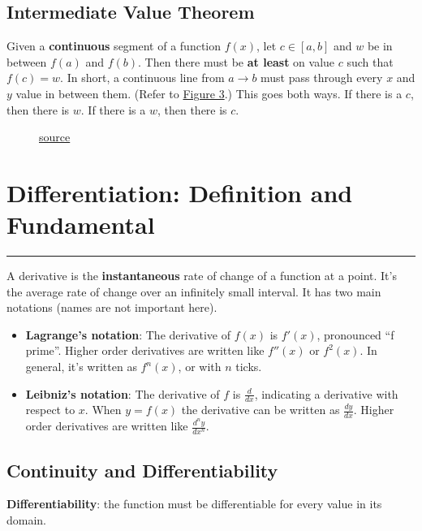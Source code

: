 \documentclass[12pt]{article}
\newcommand{\fline}{\par\noindent\rule{\textwidth}{0.1pt}} %
\begin{document}
\subsection{Intermediate Value Theorem}
Given a \textbf{continuous} segment of a function $f(x)$, let $c \in [a, b]$ and $w$ be in between $f(a)$ and $f(b)$. Then there must be \textbf{at least} on value $c$ such that $f(c) = w$. In short, a continuous line from $a \to b$ must pass through every $x$ and $y$ value in between them. (Refer to \hyperref[fig:intvaltheorem]{Figure 3}.) This goes both ways. If there is a $c$, then there is  $w$. If there is a $w$, then there is $c$.

\begin{figure}[H]
    \begin{center}
        \caption{\href{https://www.mathsisfun.com/algebra/intermediate-value-theorem.html}{source}}
        \label{fig:intvaltheorem}
    \end{center}
\end{figure}

\section[Differentiation: Definition and Fundamental Properties]{Differentiation: Definition and Fundamental}
\fline

A derivative is the \textbf{instantaneous} rate of change of a function at a point. It's the average rate of change over an infinitely small interval. It has two main notations (names are not important here).
\begin{itemize} %
    \item \textbf{Lagrange's notation}:
          The derivative of $f(x)$ is $f'(x)$, pronounced ``f prime''. Higher order derivatives are written like $f''(x)$ or $f^2(x)$. In general, it's written as $f^{n}(x)$, or with $n$ ticks.
    \item \textbf{Leibniz's notation}:
          The derivative of $f$ is $\frac{d}{dx}$, indicating a derivative with respect to $x$. When $y=f(x)$ the derivative can be written as $\frac{dy}{dx}$. Higher order derivatives are written like $\frac{d^{n}y}{dx^{n}}$.
\end{itemize}

\subsection{Continuity and Differentiability}
\noindent \textbf{Differentiability}: the function must be differentiable for every value in its domain.
\end{document}
